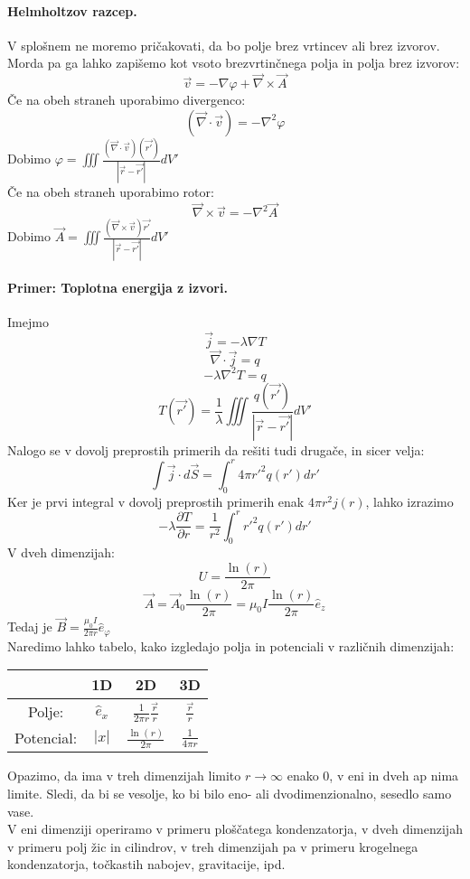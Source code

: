 \documentclass[a4paper]{article}
\newcommand{\vct}[1]{\overrightarrow{#1}}
\newcommand{\pd}[2]{\frac{\partial {#1}}{\partial {#2}}}
\begin{document}
\paragraph{Helmholtzov razcep.} V splošnem ne moremo pričakovati, da bo polje brez vrtincev ali brez izvorov. Morda pa ga lahko zapišemo kot vsoto brezvrtinčnega polja in polja brez izvorov:
$$\vct{v} = -\nabla\varphi + \vct\nabla\times\vct{A}$$
Če na obeh straneh uporabimo divergenco:
$$(\vct\nabla\cdot\vct{v}) = -\nabla^2\varphi$$
Dobimo $\displaystyle{\varphi = \iiint \frac{(\vct\nabla\cdot\vct{v})(\vct{r'})}{|\vct{r} - \vct{r'}|}dV'}$ \\
Če na obeh straneh uporabimo rotor:
$$\vct\nabla\times\vct{v} = -\nabla^2\vct{A}$$
Dobimo $\displaystyle{\vct{A} = \iiint \frac{(\vct\nabla\times\vct{v})\vct{r'}}{|\vct{r} - \vct{r'}|}dV'}$ \\
\paragraph{Primer: Toplotna energija z izvori.} Imejmo
$$\vct{j} = -\lambda\nabla T$$
$$\vct\nabla\cdot\vct{j} = q$$
$$-\lambda\nabla^2T=q$$
$$T(\vct{r'}) = \frac{1}{\lambda}\iiint\frac{q(\vct{r'})}{|\vct{r} - \vct{r'}|}dV'$$
Nalogo se v dovolj preprostih primerih da rešiti tudi drugače, in sicer velja:
$$\int \vct{j}\cdot d\vct{S} = \int_{0}^{r}4\pi r'^2 q(r') dr'$$
Ker je prvi integral v dovolj preprostih primerih enak $4\pi r^2 j(r)$, lahko izrazimo
$$-\lambda\pd{T}{r} = \frac{1}{r^2}\int_{0}^{r}r'^2q(r')dr'$$
V dveh dimenzijah:
$$U = \frac{\ln(r)}{2\pi}$$
$$\vct{A} = \vct{A}_0 \frac{\ln(r)}{2\pi} = \mu_0I\frac{\ln(r)}{2\pi}\hat{e}_z$$
Tedaj je $\displaystyle{\vct{B} = \frac{\mu_0I}{2\pi r}\hat{e}_\varphi}$ \\[3mm]
Naredimo lahko tabelo, kako izgledajo polja in potenciali v različnih dimenzijah:
\begin{table}[h!]
    \centering
    \begin{tabular}{c|c|c|c}
        & 1D & 2D & 3D \\[3mm]
        \hline
        Polje: & $\displaystyle{\hat{e}_x}$ & $\displaystyle{\frac{1}{2\pi r}\frac{\vct{r}}{r}}$ & $\displaystyle{\frac{\vct{r}}{r}}$ \\[3mm]
        \hline
        Potencial: & $\displaystyle{|x|}$ & $\displaystyle{\frac{\ln(r)}{2\pi}}$ & $\displaystyle{\frac{1}{4 \pi r}}$ \\
    \end{tabular}
\end{table}
Opazimo, da ima v treh dimenzijah limito $r\to\infty$ enako 0, v eni in dveh ap nima limite. Sledi, da bi se vesolje, ko bi bilo eno- ali dvodimenzionalno, sesedlo samo vase. \\
V eni dimenziji operiramo v primeru ploščatega kondenzatorja, v dveh dimenzijah v primeru polj žic in cilindrov, v treh dimenzijah pa v primeru krogelnega kondenzatorja, točkastih nabojev, gravitacije, ipd.
\end{document}
